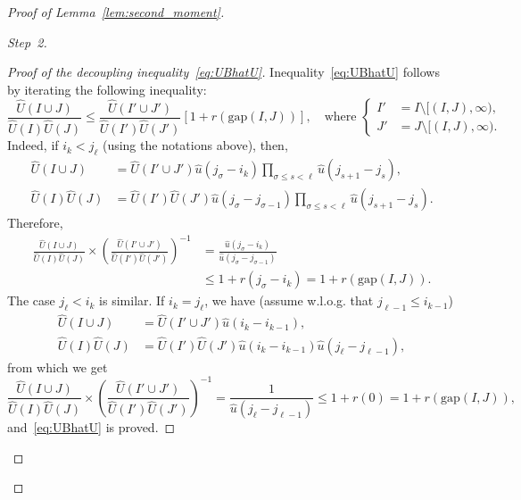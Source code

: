 \documentclass[10pt]{amsart}
\theoremstyle{definition}\newtheorem{defi}[theo]{Definition}\newtheorem{rema}[theo]{Remark}\newtheorem{exam}[theo]{Example}\newtheorem{exem}[theo]{Example}\newtheorem{nota}[theo]{Notation}
\newcommand{\hu}{\hat u}
\newcommand{\hU}{\hat U}
\newcommand{\gap}{{\mathrm{gap}}}
\newenvironment{step}[1]{\begin{proof}[{#1}]}{\let\qed\relax \end{proof}}
\begin{document}
\begin{proof}[Proof of Lemma~\ref{lem:second_moment}]
\begin{step}{Step~2}
\begin{proof}[Proof of the decoupling inequality~\eqref{eq:UBhatU}]
Inequality~\eqref{eq:UBhatU} follows by iterating the following inequality:
\begin{equation}
\frac{\hU(I \cup J)}{\hU(I) \hU(J)} \leq \frac{\hU(I' \cup J')}{\hU(I') \hU(J')}[1 + r(\gap(I,J))], \quad \text{where }\left\{
\begin{aligned}
I'&= I \setminus [(I,J),\infty),\\
J'&= J \setminus [(I,J),\infty).
\end{aligned}
\right.
\end{equation}
Indeed, if $i_k < j_\ell$ (using the notations above), then,
\begin{equation}
\begin{aligned}
\hU(I \cup J) &= \hU(I' \cup J') \hu(j_\sigma - i_k) \prod_{\sigma \leq s < \ell} \hu(j_{s+1}-j_s),\\
\hU(I)\hU(J) &= \hU(I')\hU(J') \hu(j_\sigma - j_{\sigma-1}) \prod_{\sigma \leq s < \ell} \hu(j_{s+1}-j_s).
\end{aligned}
\end{equation}
Therefore,
\begin{equation}
\begin{aligned}
\frac{\hU(I \cup J)}{\hU(I) \hU(J)} \times \left(\frac{\hU(I' \cup J')}{\hU(I') \hU(J')} \right)^{-1} &= \frac{\hu(j_\sigma - i_k)}{\hu(j_\sigma - j_{\sigma-1})}\\
& \leq 1 + r(j_\sigma - i_k) = 1 + r(\gap(I,J)).
\end{aligned}
\end{equation}
The case $j_\ell < i_k$ is similar. If $i_k = j_\ell$, we have (assume w.l.o.g. that $j_{\ell-1} \leq i_{k-1}$)
\begin{equation}
\begin{aligned}
\hU(I \cup J) &= \hU(I' \cup J') \hu(i_k - i_{k-1}),\\
\hU(I) \hU(J) &= \hU(I') \hU(J') \hu(i_k - i_{k-1}) \hu(j_\ell - j_{\ell-1}),
\end{aligned}
\end{equation}
from which we get
\begin{equation}
\frac{\hU(I \cup J)}{\hU(I) \hU(J)} \times \left(\frac{\hU(I' \cup J')}{\hU(I') \hU(J')} \right)^{-1} = \frac{1}{\hu(j_\ell - j_{\ell-1})} \leq 1 + r(0) = 1 + r(\gap(I,J)),
\end{equation}
and~\eqref{eq:UBhatU} is proved.
\end{proof}
\end{step}


\end{proof}
\end{document}
